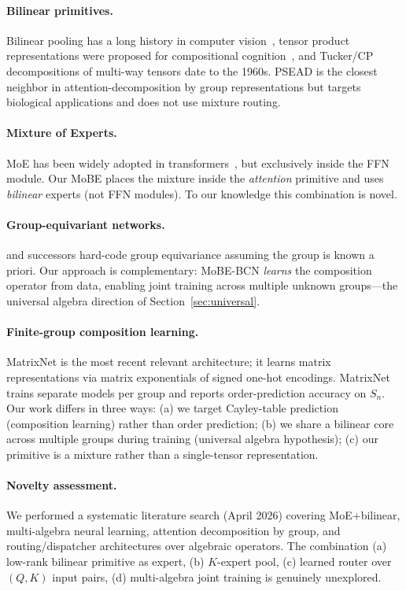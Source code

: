 \documentclass[11pt]{article}
\begin{document}
\paragraph{Bilinear primitives.}
Bilinear pooling has a long history in computer
vision~\citep{lin2015bilinear}, tensor product representations were
proposed for compositional cognition~\citep{smolensky1990tensor},
and Tucker/CP decompositions of multi-way tensors date to the 1960s.
PSEAD \citep{olanrewaju2025psead} is the closest neighbor in
attention-decomposition by group representations but targets biological
applications and does not use mixture routing.

\paragraph{Mixture of Experts.}
MoE has been widely adopted in
transformers~\citep{shazeer2017outrageously,fedus2022switch,jiang2024mixtral},
but exclusively inside the FFN module. Our MoBE places the mixture
inside the \emph{attention} primitive and uses \emph{bilinear} experts
(not FFN modules). To our knowledge this combination is novel.

\paragraph{Group-equivariant networks.}
\citet{cohen2016group} and successors hard-code group equivariance
assuming the group is known a priori. Our approach is complementary:
MoBE-BCN \emph{learns} the composition operator from data, enabling
joint training across multiple unknown groups---the universal algebra
direction of Section~\ref{sec:universal}.

\paragraph{Finite-group composition learning.}
MatrixNet \citep{wood2024matrixnet} is the most recent relevant
architecture; it learns matrix representations via matrix exponentials
of signed one-hot encodings. MatrixNet trains separate models per group
and reports order-prediction accuracy on $S_n$. Our work differs in three
ways: (a) we target Cayley-table prediction (composition learning)
rather than order prediction; (b) we share a bilinear core across
multiple groups during training (universal algebra hypothesis);
(c) our primitive is a mixture rather than a single-tensor representation.

\paragraph{Novelty assessment.}
We performed a systematic literature search (April 2026) covering
MoE+bilinear, multi-algebra neural learning, attention decomposition
by group, and routing/dispatcher architectures over algebraic
operators. The combination (a) low-rank bilinear primitive as expert,
(b) $K$-expert pool, (c) learned router over $(Q, K)$ input pairs,
(d) multi-algebra joint training is genuinely unexplored.
\end{document}

